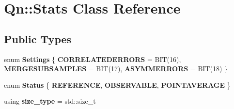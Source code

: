 \hypertarget{classQn_1_1Stats}{}\section{Qn\+:\+:Stats Class Reference}
\label{classQn_1_1Stats}
\subsection*{Public Types}
\begin{DoxyCompactItemize}
\item 
\mbox{\label{classQn_1_1Stats_a7df7df8145535a8cfe715912d0e98052}} 
enum {\bfseries Settings} \{ {\bfseries C\+O\+R\+R\+E\+L\+A\+T\+E\+D\+E\+R\+R\+O\+RS} = B\+IT(16), 
{\bfseries M\+E\+R\+G\+E\+S\+U\+B\+S\+A\+M\+P\+L\+ES} = B\+IT(17), 
{\bfseries A\+S\+Y\+M\+M\+E\+R\+R\+O\+RS} = B\+IT(18)
 \}
\item 
\mbox{\label{classQn_1_1Stats_a86fbbe052e799190c92154b48664185e}} 
enum {\bfseries Status} \{ {\bfseries R\+E\+F\+E\+R\+E\+N\+CE}, 
{\bfseries O\+B\+S\+E\+R\+V\+A\+B\+LE}, 
{\bfseries P\+O\+I\+N\+T\+A\+V\+E\+R\+A\+GE}
 \}
\item 
\mbox{\label{classQn_1_1Stats_a4b08e9313f81ca0d62ff95229dcca741}} 
using {\bfseries size\+\_\+type} = std\+::size\+\_\+t
\end{DoxyCompactItemize}
